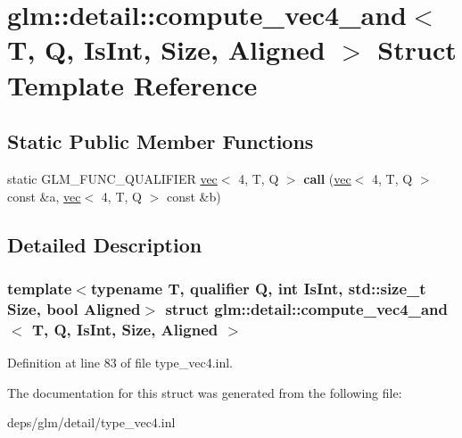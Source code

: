 \hypertarget{structglm_1_1detail_1_1compute__vec4__and}{}\section{glm\+:\+:detail\+:\+:compute\+\_\+vec4\+\_\+and$<$ T, Q, Is\+Int, Size, Aligned $>$ Struct Template Reference}
\label{structglm_1_1detail_1_1compute__vec4__and}
\subsection*{Static Public Member Functions}
\begin{DoxyCompactItemize}
\item 
\mbox{\label{structglm_1_1detail_1_1compute__vec4__and_a4d598ecb932a788803218d4cc2444c9a}} 
static G\+L\+M\+\_\+\+F\+U\+N\+C\+\_\+\+Q\+U\+A\+L\+I\+F\+I\+ER \hyperlink{structglm_1_1vec}{vec}$<$ 4, T, Q $>$ {\bfseries call} (\hyperlink{structglm_1_1vec}{vec}$<$ 4, T, Q $>$ const \&a, \hyperlink{structglm_1_1vec}{vec}$<$ 4, T, Q $>$ const \&b)
\end{DoxyCompactItemize}


\subsection{Detailed Description}
\subsubsection*{template$<$typename T, qualifier Q, int Is\+Int, std\+::size\+\_\+t Size, bool Aligned$>$\newline
struct glm\+::detail\+::compute\+\_\+vec4\+\_\+and$<$ T, Q, Is\+Int, Size, Aligned $>$}



Definition at line 83 of file type\+\_\+vec4.\+inl.



The documentation for this struct was generated from the following file\+:\begin{DoxyCompactItemize}
\item 
deps/glm/detail/type\+\_\+vec4.\+inl\end{DoxyCompactItemize}
